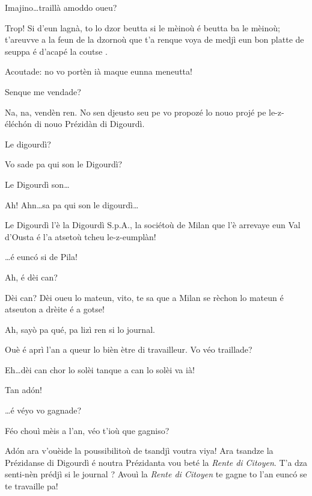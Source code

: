 \begin{drama}
\Dallasspeaks Imajino\ldots traillà amoddo oueu?

\Jeanspeaks {} Trop! Si d'eun lagnà, to lo dzor beutta si le mèinoù é beutta ba le mèinoù; t'areuvve a la feun de la dzornoù que t'a renque voya de medjì eun bon platte de seuppa é d'acapé la coutse  . 

\Dallasspeaks Acoutade: no vo portèn ià maque eunna meneutta!

\Jeanspeaks Senque me vendade?

\Joellespeaks Na, na, vendèn ren. No sen djeusto seu pe vo propozé lo nouo projé pe le-z-éléch\'on di nouo Prézidàn di Digourdì.

\Jeanspeaks Le digourdì?

\Dallasspeaks Vo sade pa qui son le Digourdì?


\Joellespeaks Le Digourdì son\ldots


\Dallasspeaks Ah! Ahn\ldots sa pa qui son le digourdì\ldots


\Dallasspeaks Le Digourdì l'è la Digourdì S.p.A., la sociétoù de Milan que l'è arrevaye eun Val d'Ousta é l'a atsetoù tcheu le-z-eumplàn!

\Joellespeaks \ldots é eunc\'o si de Pila!

\Jeanspeaks Ah, é dèi can?

\Dallasspeaks Dèi can? Dèi oueu lo mateun, vito, te sa que a Milan se rèchon lo mateun é atseuton a drèite é a gotse!

\Jeanspeaks Ah, sayò pa qué, pa lizì ren si lo journal.

\Joellespeaks Ouè é aprì l'an a queur lo bièn ètre di travailleur. Vo véo traillade?

\Jeanspeaks  Eh\ldots dèi can chor lo solèi tanque a can lo solèi va ià!

\Joellespeaks Tan ad\'on!

\Dallasspeaks \ldots é véyo vo gagnade?

\Jeanspeaks Féo chouì mèis a l'an, véo t'ioù que gagniso?

\Dallasspeaks Ad\'on ara v'ouèide la poussibilitoù de tsandjì voutra viya! Ara tsandze la Prézidanse di Digourdì é noutra Prézidanta vou beté la \textit{Rente di Citoyen}. T'a dza senti-nèn prédjì si le journal \journal ? Avouì la \textit{Rente di Citoyen} te gagne to l'an eunc\'o se te travaille pa!


\end{drama}
